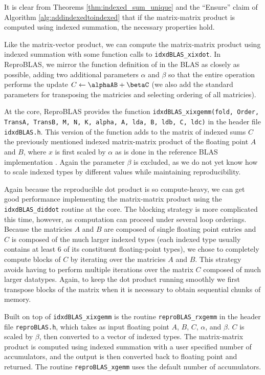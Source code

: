   It is clear from Theorems \ref{thm:indexed_sum_unique} and the ``Ensure'' claim of Algorithm \ref{alg:addindexedtoindexed} that if the matrix-matrix product is computed using indexed summation, the necessary properties hold.

  Like the matrix-vector product, we can compute the matrix-matrix product using indexed summation with some function calls to \texttt{idxdBLAS_xixdot}. In ReproBLAS, we mirror the function definition of  in the BLAS as closely as possible, adding two additional parameters $\alpha$ and $\beta$ so that the entire operation performs the update $C \gets \alphaAB + \betaC$ (we also add the standard parameters for transposing the matricies and selecting ordering of all matricies).

  At the core, ReproBLAS provides the function \texttt{idxdBLAS_xixgemm(fold, Order, TransA, TransB, M, N, K, alpha, A, lda, B, ldb, C, ldc)} in the header file \texttt{idxdBLAS.h}. This version of the function adds to the matrix of indexed sums $C$ the previously mentioned indexed matrix-matrix product of the floating point $A$ and $B$, where $x$ is first scaled by $\alpha$ as is done in the reference BLAS implementation \cite{netlib}. Again the parameter $\beta$ is excluded, as we do not yet know how to scale indexed types by different values while maintaining reproducibility.

  Again because the reproducible dot product is so compute-heavy, we can get good performance implementing the matrix-matrix product using the \texttt{idxdBLAS_diddot} routine at the core. The blocking strategy is more complicated this time, however, as computation can proceed under several loop orderings. Because the matricies $A$ and $B$ are composed of single floating point entries and $C$ is composed of the much larger indexed types (each indexed type usually contains at least 6 of its constituent floating-point types), we chose to completely compute blocks of $C$ by iterating over the matricies $A$ and $B$. This strategy avoids having to perform multiple iterations over the matrix $C$ composed of much larger datatypes. Again, to keep the dot product running smoothly we first transpose blocks of the matrix when it is necessary to obtain sequential chunks of memory.

  Built on top of \texttt{idxdBLAS_xixgemm} is the routine \texttt{reproBLAS_rxgemm} in the header file \texttt{reproBLAS.h}, which takes as input floating point $A$, $B$, $C$, $\alpha$, and $\beta$. $C$ is scaled by $\beta$, then converted to a vector of indexed types. The matrix-matrix product is computed using indexed summation with a user specified number of accumulators, and the output is then converted back to floating point and returned. The routine \texttt{reproBLAS_xgemm} uses the default number of accumulators.

